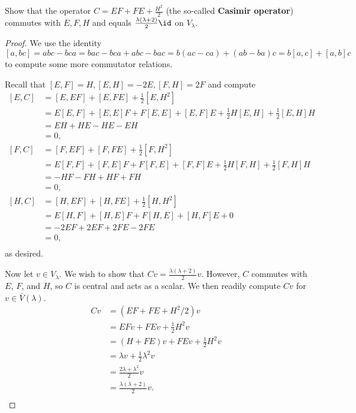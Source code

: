 \documentclass{article}
\begin{document}
\begin{prb}
Show that the operator $C = EF + FE + \frac{H^2}{2}$ (the so-called
\textbf{Casimir operator}) commutes with $E, F, H$ and equals $\frac{\lambda
(\lambda + 2)}{2} \id$ on $V_{\lambda}$.
\end{prb}

\begin{proof}
We use the identity
\[ [a, bc] = abc - bca = bac - bca + abc - bac = b(ac - ca) + (ab - ba)c = b[a,
c] + [a, b]c \]
to compute some more commutator relations.

Recall that $[E, F] = H, [E, H] = -2E, [F, H] = 2F$ and compute
\[ \begin{aligned}
[E, C] &= [E, EF] + [E, FE] + \frac{1}{2} [E, H^2] \\
&= E [E, F] + [E, E] F + F [E, E] + [E, F] E + \frac{1}{2} H [E, H] +
\frac{1}{2} [E, H] H \\
&= EH + HE - HE - EH \\
&= 0, \\
[F, C] &= [F, EF] + [F, FE] + \frac{1}{2} [F, H^2] \\
&= E [F, F] + [F, E] F + F [F, E] + [F, F] E + \frac{1}{2} H [F, H] +
\frac{1}{2} [F, H] H \\
&= -HF - FH + HF + FH \\
&= 0, \\
[H, C] &= [H, EF] + [H, FE] + \frac{1}{2} [H, H^2] \\
&= E [H, F] + [H, E] F + F [H, E] + [H, F] E + 0 \\
&= -2EF + 2EF + 2FE - 2FE \\
&= 0, \\
\end{aligned} \]
as desired.

Now let $v \in V_{\lambda}$. We wish to show that $Cv = \frac{\lambda (\lambda +
2)}{2} v$. However, $C$ commutes with $E$, $F$, and $H$, so $C$ is central and
acts as a scalar. We then readily compute $Cv$ for $v \in \bar{V}(\lambda)$.
\[ \begin{aligned}
Cv &= (EF + FE + H^2 / 2) v \\
&= EF v + FE v + \frac{1}{2} H^2 v \\
&= (H + FE) v + FE v + \frac{1}{2} H^2 v \\
&= \lambda v + \frac{1}{2} \lambda^2 v \\
&= \frac{2 \lambda + \lambda^2}{2} v \\
&= \frac{\lambda (\lambda + 2)}{2} v. \\
\end{aligned} \]
\end{proof}
\end{document}
